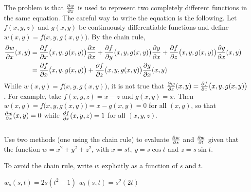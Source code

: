 \begin{solution}
The problem is that $\pdiff{w}{x}$ is used
to represent
two completely different functions in the same equation. The careful way
to write the equation is the following. Let $f(x,y,z)$
and $g(x,y)$ be continuously differentiable functions and define
$w(x,y)=f\big(x,y,g(x,y)\big)$. By the chain rule,
\begin{align*}
\pdiff{w}{x}(x,y)
&=\pdiff{f}{x}\big(x,y,g(x,y)\big)
\pdiff{x}{x}
+\pdiff{f}{y}\big(x,y,g(x,y)\big)
\pdiff{y}{x}
+\pdiff{f}{z}\big(x,y,g(x,y)\big)
\pdiff{g}{x}(x,y)\cr
&=\pdiff{f}{x}\big(x,y,g(x,y)\big)
+\pdiff{f}{z}\big(x,y,g(x,y)\big)
\pdiff{g}{x}(x,y)
\end{align*}
While $w(x,y)=f\big(x,y,g(x,y)\big)$, it is not true that
$\pdiff{w}{x}(x,y)
=\pdiff{f}{x}\big(x,y,g(x,y)\big)$.
For example, take $f(x,y,z)=x-z$ and $g(x,y)=x$. Then 
$w(x,y)=f\big(x,y,g(x,y)\big)=x-g(x,y)=0$ for all $(x,y)$, so that 
$\pdiff{w}{x}(x,y)=0$
while $\pdiff{f}{x}(x,y,z)=1$ for all $(x,y,z)$.
\end{solution}



\subsection*{\Procedural}

\begin{question}
Use two methods (one using the chain rule) to evaluate 
$\pdiff{w}{s}$ and $\pdiff{w}{t}$ 
given that the function $w=x^2+y^2+z^2$, with 
$x=st,\ y=s\cos t$ and $z=s\sin t$.
\end{question}

\begin{hint}
To avoid the chain rule, write $w$ explicitly as a function of $s$ and $t$.
\end{hint}

\begin{answer}
$w_s(s,t)=2s(t^2+1)$\qquad
$w_t(s,t)=s^2(2t)$
\end{answer}

